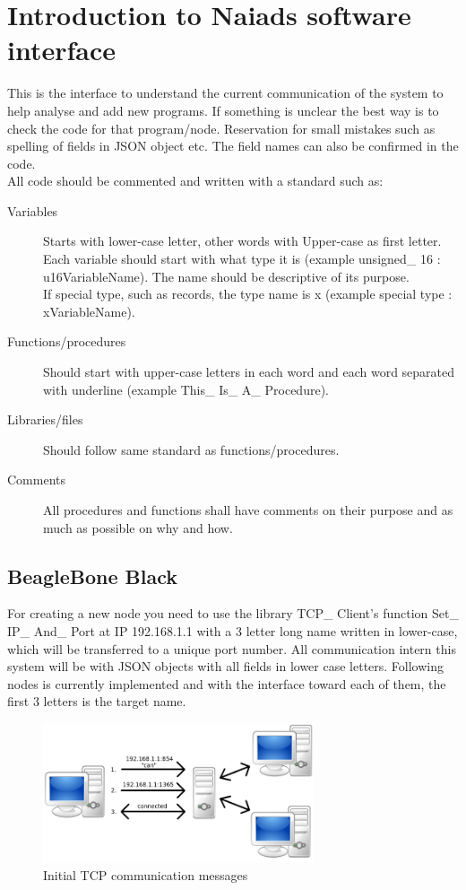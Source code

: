 \section{Introduction to Naiads software interface}
\noindent This is the interface to understand the current communication of the system to help analyse and add new programs. If something is unclear the best way is to check the code for that program/node. Reservation for small mistakes such as spelling of fields in JSON object etc. The field names can also be confirmed in the code.\\
All code should be commented and written with a standard such as:
\begin{description}
  \item[Variables] Starts with lower-case letter, other words with Upper-case as first letter. Each variable should start with what type it is (example unsigned\_ 16 : u16VariableName). The name should be descriptive of its purpose.
  \\If special type, such as records, the type name is x (example special type : xVariableName).
  \item[Functions/procedures] Should start with upper-case letters in each word and each word separated with underline (example This\_ Is\_ A\_ Procedure).
  \item[Libraries/files] Should follow same standard as functions/procedures.
  \item[Comments] All procedures and functions shall have comments on their purpose and as much as possible on why and how.
\end{description}

\subsection{BeagleBone Black}
\noindent For creating a new node you need to use the library TCP\_ Client's function Set\_ IP\_ And\_ Port at IP 192.168.1.1 with a 3 letter long name written in lower-case, which will be transferred to a unique port number.
All communication intern this system will be with JSON objects with all fields in lower case letters.
Following nodes is currently implemented and with the interface toward each of them, the first 3 letters is the target name.


\begin{figure}[!ht]
	\begin{center}
		\includegraphics[width=80mm]{./Images/Software/tcp_init_connection.png}
		\caption{Initial TCP communication messages}
		\label{YourLabel}
	\end{center}
\end{figure}



